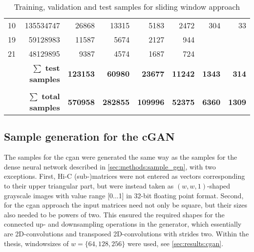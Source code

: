 \begin{table}[hbp]
\begin{tabular}{lrrrrrrr}
10                                                       & 135534747                                               & 26868                  & 13315                   & 5183                    & 2472                    & 304                      & 33                       \\
19                                                       & 59128983                                                & 11587                  & 5674                    & 2127                    & 944                     &                          &                          \\
21                                                       & 48129895                                                & 9387                   & 4574                    & 1687                    & 724                     &                          &                          \\
\multicolumn{2}{r}{$\mathbf{\sum}$ \textbf{test samples}}                                                                          & \textbf{123153}        & \textbf{60980}          & \textbf{23677}          & \textbf{11242}          & \textbf{1343}            & \textbf{314}             \\
                                                         &                                                         & \multicolumn{1}{l}{}   & \multicolumn{1}{l}{}    & \multicolumn{1}{l}{}    & \multicolumn{1}{l}{}    & \multicolumn{1}{l}{}     & \multicolumn{1}{l}{}     \\
\multicolumn{2}{r}{$\mathbf{\sum}$ \textbf{total samples}}                                                                         & \textbf{570958}        & \textbf{282855}         & \textbf{109996}         & \textbf{52375}          & \textbf{6360}            & \textbf{1309}            \\ \hline
\end{tabular}
\caption{Training, validation and test samples for sliding window approach} \label{tab:methods:samples}
\end{table}

\subsection{Sample generation for the cGAN} \label{sec:methods:sample_gen_cgan}
The samples for the \acrshort{cgan} were generated the same way as the samples for the dense neural network described 
in \cref{sec:methods:sample_gen}, with two exceptions.
First, Hi-C (sub-)matrices were not entered as vectors corresponding to their upper triangular part, 
but were instead taken as $(w, w, 1)$-shaped grayscale images with value range [0...1] in 32-bit floating point format.
Second, for the \acrshort{cgan} approach the input matrices need not only be square,
but their sizes also needed to be powers of two. 
This ensured the required shapes for the connected up- and downsampling operations in the generator, 
which essentially are 2D-convolutions and transposed 2D-convolutions with strides two.
Within the thesis, windowsizes of $w=\{64,128,256\}$ were used, see \cref{sec:results:cgan}.

